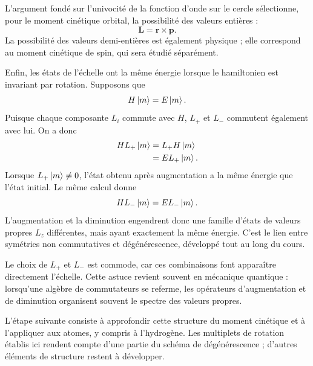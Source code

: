 L’argument fondé sur l’univocité de la fonction d’onde sur le cercle sélectionne, pour le moment cinétique orbital, la possibilité des valeurs entières :
\begin{equation}
\mathbf L=\mathbf r\times\mathbf p.
\end{equation}
La possibilité des valeurs demi-entières est également physique ; elle correspond au moment cinétique de spin, qui sera étudié séparément.

Enfin, les états de l’échelle ont la même énergie lorsque le hamiltonien est invariant par rotation. Supposons que
\begin{equation}
H\left\lvert m\right\rangle=E\left\lvert m\right\rangle.
\end{equation}
Puisque chaque composante \(L_i\) commute avec \(H\), \(L_+\) et \(L_-\) commutent également avec lui. On a donc
\begin{align}
H L_+\left\lvert m\right\rangle
&=L_+H\left\lvert m\right\rangle\\
&=E L_+\left\lvert m\right\rangle.
\end{align}
Lorsque \(L_+\left\lvert m\right\rangle\neq0\), l’état obtenu après augmentation a la même énergie que l’état initial. Le même calcul donne
\begin{equation}
H L_-\left\lvert m\right\rangle=E L_-\left\lvert m\right\rangle.
\end{equation}
L’augmentation et la diminution engendrent donc une famille d’états de valeurs propres \(L_z\) différentes, mais ayant exactement la même énergie. C’est le lien entre symétries non commutatives et dégénérescence, développé tout au long du cours.

\begin{classroomqa}
\end{classroomqa}

Le choix de \(L_+\) et \(L_-\) est commode, car ces combinaisons font apparaître directement l’échelle. Cette astuce revient souvent en mécanique quantique : lorsqu’une algèbre de commutateurs se referme, les opérateurs d’augmentation et de diminution organisent souvent le spectre des valeurs propres.

\begin{classroomqa}
\end{classroomqa}

L’étape suivante consiste à approfondir cette structure du moment cinétique et à l’appliquer aux atomes, y compris à l’hydrogène. Les multiplets de rotation établis ici rendent compte d’une partie du schéma de dégénérescence ; d’autres éléments de structure restent à développer.
